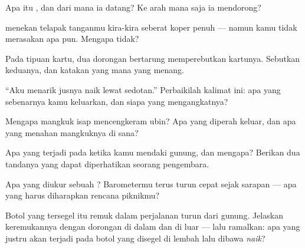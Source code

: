 \begin{exercise}[$\star$]\label{exo:g5:air-pressure-weather:2}
Apa itu , dan dari mana ia datang? Ke arah mana saja ia
mendorong?
\end{exercise}

\begin{exercise}[$\star$]\label{exo:g5:air-pressure-weather:3}
 menekan telapak tanganmu kira-kira seberat koper penuh ---
namun kamu tidak merasakan apa pun. Mengapa tidak?
\end{exercise}

\begin{exercise}[$\star$]\label{exo:g5:air-pressure-weather:4}
Pada tipuan kartu, dua dorongan bertarung memperebutkan kartunya.
Sebutkan keduanya, dan katakan yang mana yang menang.
\end{exercise}

\begin{exercise}[$\star$]\label{exo:g5:air-pressure-weather:5}
``Aku menarik jusnya naik lewat sedotan.'' Perbaikilah kalimat ini:
apa yang sebenarnya kamu keluarkan, dan siapa yang mengangkatnya?
\end{exercise}

\begin{exercise}[$\star$]\label{exo:g5:air-pressure-weather:6}
Mengapa mangkuk isap mencengkeram ubin? Apa yang diperah keluar, dan
apa yang menahan mangkuknya di sana?
\end{exercise}

\begin{exercise}[$\star$]\label{exo:g5:air-pressure-weather:7}
Apa yang terjadi pada  ketika kamu mendaki gunung, dan
mengapa? Berikan dua tandanya yang dapat diperhatikan seorang
pengembara.
\end{exercise}

\begin{exercise}[$\star$]\label{exo:g5:air-pressure-weather:8}
Apa yang diukur sebuah ? Barometermu terus turun cepat sejak
sarapan --- apa yang harus diharapkan rencana piknikmu?
\end{exercise}

\begin{exercise}[$\star\star$]\label{exo:g5:air-pressure-weather:9}
Botol yang tersegel itu remuk dalam perjalanan turun dari gunung.
Jelaskan keremukannya dengan dorongan di dalam dan di luar --- lalu
ramalkan: apa yang justru akan terjadi pada botol yang disegel di
lembah lalu dibawa \emph{naik}?
\end{exercise}

